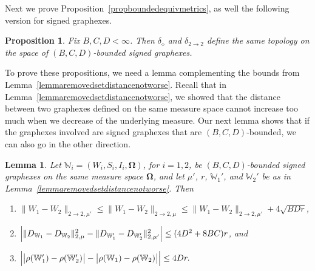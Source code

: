 \documentclass{amsart}
\numberwithin{equation}{section}
\numberwithin{figure}{section}
\newtheorem{proposition}[theorem]{Proposition}
\newtheorem{lemma}[theorem]{Lemma}
\theoremstyle{definition}
\theoremstyle{remark}
\newcommand{\bOmega}{{\mathbf{\Omega}}}
\newcommand{\cW}{\mathbb{W}}
\newcommand{\deltt}{\delta_{2\to 2}}
\def\delGP{\delta_\diamond}
\begin{document}
Next we prove Proposition~\ref{propboundedequivmetrics}, as well the
following version for signed graphexes.

\begin{proposition} \label{prop:signed-met-equiv}
Fix $B,C,D<\infty$. Then $\delGP$ and $\deltt$ define the same topology on
the space of $(B,C,D)$-bounded signed graphexes.
\end{proposition}

To prove these propositions, we need a lemma complementing the bounds from
Lemma~\ref{lemmaremovedsetdistancenotworse}. Recall that in
Lemma~\ref{lemmaremovedsetdistancenotworse}, we showed that the distance
between two graphexes defined on the same measure space cannot increase too
much when we decrease of the underlying measure. Our next lemma shows that if
the graphexes involved are signed graphexes that are $(B,C,D)$-bounded, we
can also go in the other direction.

\begin{lemma} \label{lemmaremovednotmuchsmaller}
Let $\cW_i=(W_i,S_i,I_i,\bOmega)$, for $i=1,2$, be $(B,C,D)$-bounded signed
graphexes on the same measure space $\bOmega$, and let
 $\mu'$, $r$, $\cW_1'$, and $\cW_2'$ be as in Lemma~\ref{lemmaremovedsetdistancenotworse}.
Then
\begin{enumerate}
\item $\|W_1-W_2\|_{2 \rightarrow 2,\mu'}\le \|W_1-W_2\|_{2 \rightarrow
    2,\mu} \le \|W_1-W_2\|_{2 \rightarrow 2,\mu'} + {4}\sqrt{{B}D r}$,
\item $\Bigl|\|D_{\cW_1}-D_{\cW_2}\|_{2,\mu}^2 -
    \|D_{\cW_1'}-D_{\cW_2'}\|_{2,\mu'}^2 \Bigr|\leq (4D^2+8BC)r $, and
\item
    $\Bigl|\bigl|{\rho(\cW_1')-\rho(\cW_2')}\bigr|-\bigl|{\rho(\cW_1)-\rho(\cW_2)}\bigr|\Bigr|\leq
 4 Dr.$
\end{enumerate}
\end{lemma}
\end{document}
